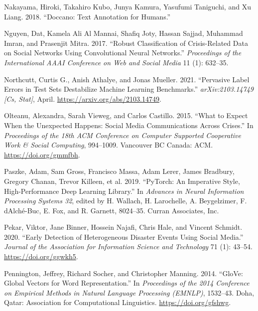 \documentclass[a4paper, notitlepage]{extreport}
\newlength{\cslhangindent}
\newenvironment{CSLReferences}[2] %
 {%
  \setlength{\parindent}{0pt}
  \ifodd #1 \everypar{\setlength{\hangindent}{\cslhangindent}}\ignorespaces\fi
  \ifnum #2 > 0
  \setlength{\parskip}{#2\baselineskip}
  \fi
 }%
 {}
\begin{document}
\begin{CSLReferences}{1}{0}
\leavevmode{}%
Nakayama, Hiroki, Takahiro Kubo, Junya Kamura, Yasufumi Taniguchi, and
Xu Liang. 2018. {``Doccano: Text Annotation for Humans.''}

\leavevmode{}%
Nguyen, Dat, Kamela Ali Al Mannai, Shafiq Joty, Hassan Sajjad, Muhammad
Imran, and Prasenjit Mitra. 2017. {``Robust {Classification} of
{Crisis}-{Related Data} on {Social Networks Using Convolutional Neural
Networks}.''} \emph{Proceedings of the International AAAI Conference on
Web and Social Media} 11 (1): 632--35.

\leavevmode{}%
Northcutt, Curtis G., Anish Athalye, and Jonas Mueller. 2021.
{``Pervasive {Label Errors} in {Test Sets Destabilize Machine Learning
Benchmarks}.''} \emph{arXiv:2103.14749 {[}Cs, Stat{]}}, April.
\url{https://arxiv.org/abs/2103.14749}.

\leavevmode{}%
Olteanu, Alexandra, Sarah Vieweg, and Carlos Castillo. 2015. {``What to
{Expect When} the {Unexpected Happens}: {Social Media Communications
Across Crises}.''} In \emph{Proceedings of the 18th {ACM Conference} on
{Computer Supported Cooperative Work} \& {Social Computing}}, 994--1009.
{Vancouver BC Canada}: {ACM}. \url{https://doi.org/gmmfbh}.

\leavevmode{}%
Paszke, Adam, Sam Gross, Francisco Massa, Adam Lerer, James Bradbury,
Gregory Chanan, Trevor Killeen, et al. 2019. {``{PyTorch}: {An}
Imperative Style, High-Performance Deep Learning Library.''} In
\emph{Advances in Neural Information Processing Systems 32}, edited by
H. Wallach, H. Larochelle, A. Beygelzimer, F. dAlché-Buc, E. Fox, and R.
Garnett, 8024--35. {Curran Associates, Inc.}

\leavevmode{}%
Pekar, Viktor, Jane Binner, Hossein Najafi, Chris Hale, and Vincent
Schmidt. 2020. {``Early Detection of Heterogeneous Disaster Events Using
Social Media.''} \emph{Journal of the Association for Information
Science and Technology} 71 (1): 43--54. \url{https://doi.org/ggwkh5}.

\leavevmode{}%
Pennington, Jeffrey, Richard Socher, and Christopher Manning. 2014.
{``{GloVe}: {Global Vectors} for {Word Representation}.''} In
\emph{Proceedings of the 2014 {Conference} on {Empirical Methods} in
{Natural Language Processing} ({EMNLP})}, 1532--43. {Doha, Qatar}:
{Association for Computational Linguistics}.
\url{https://doi.org/gfshwg}.


\end{CSLReferences}
\end{document}

